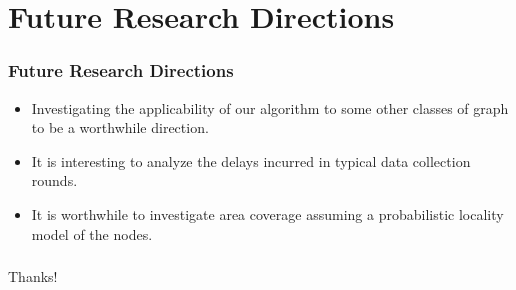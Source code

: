 \documentclass{beamer}
\begin{document}
\section{Future Research Directions}
\begin{frame}
\frametitle{Future Research Directions}
\begin{itemize}
\item Investigating the applicability of our algorithm to some other classes of graph to be a worthwhile direction.

\item It is interesting to analyze the delays incurred in typical data collection rounds.
\item It is worthwhile to investigate area coverage assuming a probabilistic locality model of the nodes.
\end{itemize}

\end{frame}


\begin{frame}
\frametitle{}
\begin{center}
\Huge Thanks!
\end{center}

\end{frame}
\end{document}
